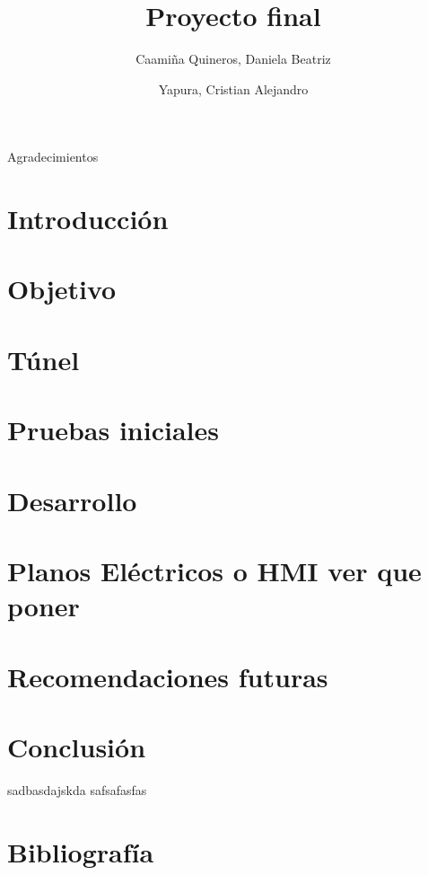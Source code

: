 \documentclass[12pt,a4paper]{article}
\author{Caamiña Quineros, Daniela Beatriz\\ \and Yapura, Cristian Alejandro}
\title{Proyecto final}
\begin{document}
	\maketitle

	\newpage
	\tableofcontents
	\newpage
	\listoffigures
	\newpage
	Agradecimientos
	\newpage

	\section{Introducción}
	

	\section{Objetivo}
	

	\section{Túnel}
		

	\section{Pruebas iniciales}
	

	\section{Desarrollo}
	

	\section{Planos Eléctricos o HMI ver que poner} 
	
	
	\section{Recomendaciones futuras}
	

	\section{Conclusión}
	
	
	sadbasdajskda \cite{LS650}
	safsafasfas \cite{airecalculo}
	\section{Bibliografía}
\printbibliography
\newpage
\end{document}
